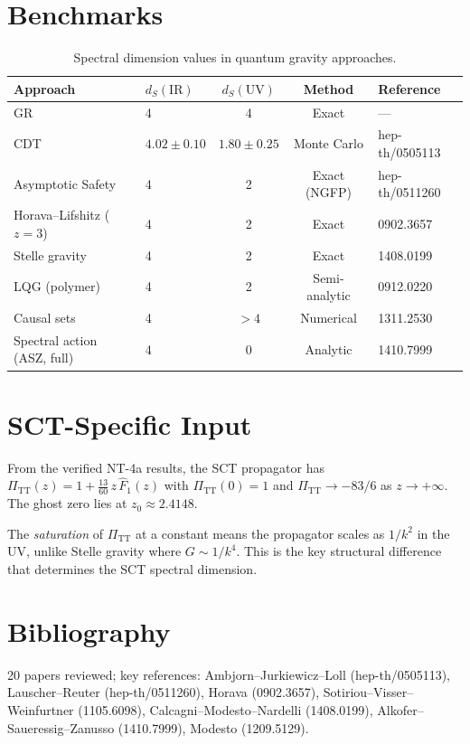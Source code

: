 \documentclass[11pt,a4paper]{article}
\begin{document}
\section{Benchmarks}

\begin{table}[h]
\centering
\begin{tabular}{llccl}
\toprule
Approach & $d_S(\mathrm{IR})$ & $d_S(\mathrm{UV})$ & Method & Reference \\
\midrule
GR & 4 & 4 & Exact & --- \\
CDT & $4.02 \pm 0.10$ & $1.80 \pm 0.25$ & Monte Carlo & hep-th/0505113 \\
Asymptotic Safety & 4 & 2 & Exact (NGFP) & hep-th/0511260 \\
Horava--Lifshitz ($z=3$) & 4 & 2 & Exact & 0902.3657 \\
Stelle gravity & 4 & 2 & Exact & 1408.0199 \\
LQG (polymer) & 4 & 2 & Semi-analytic & 0912.0220 \\
Causal sets & 4 & $>4$ & Numerical & 1311.2530 \\
Spectral action (ASZ, full) & 4 & 0 & Analytic & 1410.7999 \\
\bottomrule
\end{tabular}
\caption{Spectral dimension values in quantum gravity approaches.}
\label{tab:benchmarks}
\end{table}

\section{SCT-Specific Input}

From the verified NT-4a results, the SCT propagator has
$\Pi_{\mathrm{TT}}(z) = 1 + \tfrac{13}{60}\,z\,\hat{F}_1(z)$
with $\Pi_{\mathrm{TT}}(0) = 1$ and $\Pi_{\mathrm{TT}} \to -83/6$
as $z \to +\infty$. The ghost zero lies at $z_0 \approx 2.4148$.

The \emph{saturation} of $\Pi_{\mathrm{TT}}$ at a constant means the
propagator scales as $1/k^2$ in the UV, unlike Stelle gravity where
$G \sim 1/k^4$. This is the key structural difference that determines
the SCT spectral dimension.

\section{Bibliography}

20 papers reviewed; key references: Ambjorn--Jurkiewicz--Loll (hep-th/0505113),
Lauscher--Reuter (hep-th/0511260), Horava (0902.3657),
Sotiriou--Visser--Weinfurtner (1105.6098),
Calcagni--Modesto--Nardelli (1408.0199),
Alkofer--Saueressig--Zanusso (1410.7999),
Modesto (1209.5129).
\end{document}
